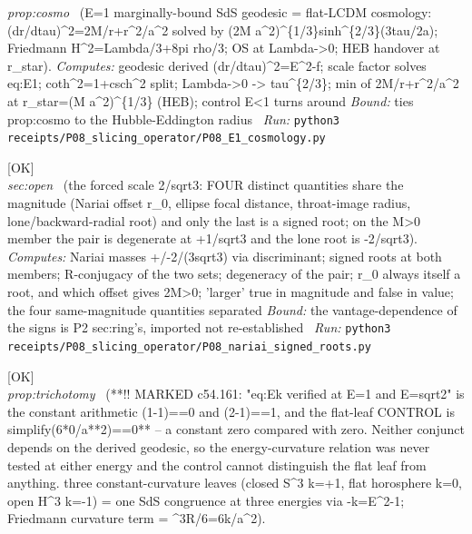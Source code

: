 \begin{description}
\textit{prop:cosmo} \ (E=1 marginally-bound SdS geodesic = flat-LCDM cosmology: (dr/dtau)\textasciicircum{}2=2M/r+r\textasciicircum{}2/a\textasciicircum{}2 solved by (2M a\textasciicircum{}2)\textasciicircum{}\{1/3\}sinh\textasciicircum{}\{2/3\}(3tau/2a); Friedmann H\textasciicircum{}2=Lambda/3+8pi rho/3; OS at Lambda->0; HEB handover at r\_star). 
\emph{Computes:} geodesic derived (dr/dtau)\textasciicircum{}2=E\textasciicircum{}2-f; scale factor solves eq:E1; coth\textasciicircum{}2=1+csch\textasciicircum{}2 split; Lambda->0 -> tau\textasciicircum{}\{2/3\}; min of 2M/r+r\textasciicircum{}2/a\textasciicircum{}2 at r\_star=(M a\textasciicircum{}2)\textasciicircum{}\{1/3\} (HEB); control E<1 turns around
 \emph{Bound:} ties prop:cosmo to the Hubble-Eddington radius
\ \emph{Run:} \texttt{python3 receipts/P08\_slicing\_operator/P08\_E1\_cosmology.py}
\item[\rcptlabel{P08_nariai_signed_roots}{P8R4}\textbf{P8R4}\quad\texttt{P08\_nariai\_signed\_roots}]\hfill\textsf{[OK]}\\
\textit{sec:open} \ (the forced scale 2/sqrt3: FOUR distinct quantities share the magnitude (Nariai offset \textbar{}r\_0\textbar{}, ellipse focal distance, throat-image radius, lone/backward-radial root) and only the last is a signed root; on the M>0 member the pair is degenerate at +1/sqrt3 and the lone root is -2/sqrt3). 
\emph{Computes:} Nariai masses +/-2/(3sqrt3) via discriminant; signed roots at both members; R-conjugacy of the two sets; degeneracy of the pair; r\_0 always itself a root, and which offset gives 2M>0; 'larger' true in magnitude and false in value; the four same-magnitude quantities separated
 \emph{Bound:} the vantage-dependence of the signs is P2 sec:ring's, imported not re-established
\ \emph{Run:} \texttt{python3 receipts/P08\_slicing\_operator/P08\_nariai\_signed\_roots.py}
\item[\rcptlabel{P08_trichotomy}{P8R5}\textbf{P8R5}\quad\texttt{P08\_trichotomy}]\hfill\textsf{[OK]}\\
\textit{prop:trichotomy} \ (**!! MARKED c54.161: "eq:Ek verified at E=1 and E=sqrt2" is the constant arithmetic (1-1)==0 and (2-1)==1, and the flat-leaf CONTROL is simplify(6*0/a**2)==0** -- a constant zero compared with zero. Neither conjunct depends on the derived geodesic, so the energy-curvature relation was never tested at either energy and the control cannot distinguish the flat leaf from anything. three constant-curvature leaves (closed S\textasciicircum{}3 k=+1, flat horosphere k=0, open H\textasciicircum{}3 k=-1) = one SdS congruence at three energies via -k=E\textasciicircum{}2-1; Friedmann curvature term = \textasciicircum{}3R/6=6k/a\textasciicircum{}2). 

\end{description}
